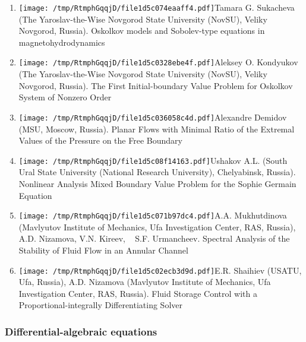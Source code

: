 \documentclass[
]{article}
\providecommand{\tightlist}{%
  \setlength{\itemsep}{0pt}\setlength{\parskip}{0pt}}
\begin{document}
\begin{enumerate}
\def\labelenumi{\arabic{enumi}.}
\tightlist
\item
  \protect\texttt{[image: /tmp/RtmphGqqjD/file1d5c074eaaff4.pdf]}Tamara
  G. Sukacheva (The Yaroslav-the-Wise Novgorod State University (NovSU),
  Veliky Novgorod, Russia). Oskolkov models and Sobolev-type equations
  in magnetohydrodynamics
\item
  \protect\texttt{[image: /tmp/RtmphGqqjD/file1d5c0328ebe4f.pdf]}Aleksey
  O. Kondyukov (The Yaroslav-the-Wise Novgorod State University (NovSU),
  Veliky Novgorod, Russia). The First Initial-boundary Value Problem for
  Oskolkov System of Nonzero Order
\item
  \protect\texttt{[image: /tmp/RtmphGqqjD/file1d5c036058c4d.pdf]}Alexandre
  Demidov (MSU, Moscow, Russia). Planar Flows with Minimal Ratio of the
  Extremal Values of the Pressure on the Free Boundary
\item
  \protect\texttt{[image: /tmp/RtmphGqqjD/file1d5c08f14163.pdf]}Ushakov
  A.L. (South Ural State University (National Research University),
  Chelyabinsk, Russia). Nonlinear Analysis Mixed Boundary Value Problem
  for the Sophie Germain Equation
\item
  \protect\texttt{[image: /tmp/RtmphGqqjD/file1d5c071b97dc4.pdf]}A.A.
  Mukhutdinova (Mavlyutov Institute of Mechanics, Ufa Investigation
  Center, RAS, Russia), A.D. Nizamova, V.N. Kireev, ~ S.F. Urmancheev.
  Spectral Analysis of the Stability of Fluid Flow in an Annular Channel
\item
  \protect\texttt{[image: /tmp/RtmphGqqjD/file1d5c02ecb3d9d.pdf]}E.R.
  Shaihiev (USATU, Ufa, Russia), A.D. Nizamova (Mavlyutov Institute of
  Mechanics, Ufa Investigation Center, RAS, Russia). Fluid Storage
  Control with a Proportional-integrally Differentiating Solver
\end{enumerate}

\hypertarget{dae}{%
\subsubsection{Differential-algebraic equations}\label{dae}}
\end{document}
